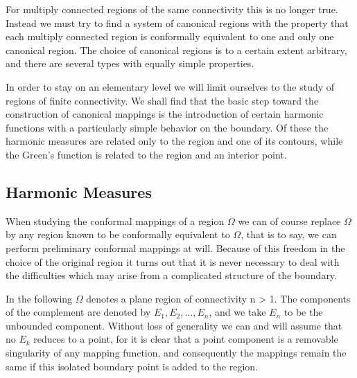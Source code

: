 \begingroup\renewcommand{\thefootnote}{}\endgroup

For multiply connected regions of the same connectivity this is no longer true. Instead we must try to find a system of canonical regions with the property that each multiply connected region is conformally equivalent to one and only one canonical region. The choice of canonical regions is to a certain extent arbitrary, and there are several types with equally simple properties.

In order to stay on an elementary level we will limit ourselves to the study of regions of finite connectivity. We shall find that the basic step toward the construction of canonical mappings is the introduction of certain harmonic functions with a particularly simple behavior on the boundary. Of these the harmonic measures are related only to the region and one of its contours, while the Green's function is related to the region and an interior point.

\setcounter{section}{5}\setcounter{subsection}{0}\subsection{Harmonic Measures}\label{sec:6.5.1}
When studying the conformal mappings of a region $\Omega$ we can of course replace $\Omega$ by any region known to be conformally equivalent to $\Omega$, that is to say, we can perform preliminary conformal mappings at will. Because of this freedom in the choice of the original region it turns out that it is never necessary to deal with the difficulties which may arise from a complicated structure of the boundary.

In the following $\Omega$ denotes a plane region of connectivity n > 1. The components of the complement are denoted by $E_{1}, E_{2}, \ldots, E_{n}$, and we take $E_{n}$ to be the unbounded component. Without loss of generality we can and will assume that no $E_{k}$ reduces to a point, for it is clear that a point component is a removable singularity of any mapping function, and consequently the mappings remain the same if this isolated boundary point is added to the region.

